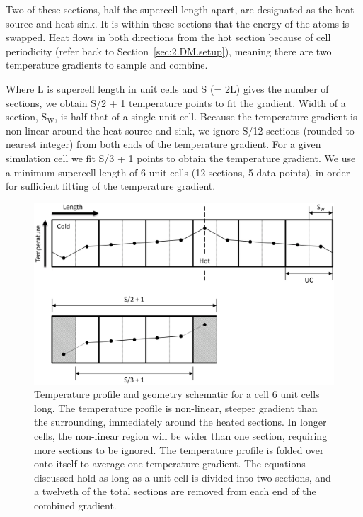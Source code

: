 Two of these sections, half the supercell length apart, are designated as the heat source and heat sink. It is within these sections that the energy of the atoms is swapped. Heat flows in both directions from the hot section because of cell periodicity (refer back to Section~\ref{sec:2.DM.setup}), meaning there are two temperature gradients to sample and combine. 

Where L is supercell length in unit cells and S (= 2L) gives the number of sections, we obtain S/2 + 1 temperature points to fit the gradient. Width of a section, S$_{\mathrm{W}}$, is half that of a single unit cell. Because the temperature gradient is non-linear around the heat source and sink, we ignore S/12 sections (rounded to nearest integer) from both ends of the temperature gradient. For a given simulation cell we fit S/3 + 1 points to obtain the temperature gradient. We use a minimum supercell length of 6 unit cells (12 sections, 5 data points), in order for sufficient fitting of the temperature gradient. 



\begin{figure}[hp!]
\includegraphics[width=\linewidth]{Figures/direct_temp_pro_03.png}
\caption[direct temperature profile 3]{Temperature profile and geometry schematic for a cell 6 unit cells long. The temperature profile is non-linear, steeper gradient than the surrounding, immediately around the heated sections. In longer cells, the non-linear region will be wider than one section, requiring more sections to be ignored. The temperature profile is folded over onto itself to average one temperature gradient. The equations discussed hold as long as a unit cell is divided into two sections, and a twelveth of the total sections are removed from each end of the combined gradient.}
\label{fig:direct_temp_pro_03}
\end{figure}

